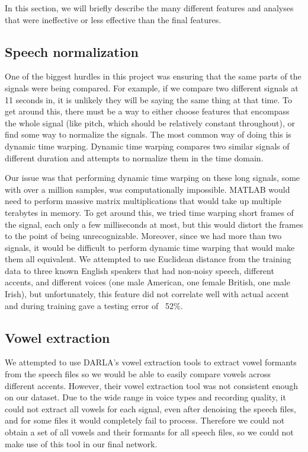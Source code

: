 \documentclass{article}
\begin{document}
In this section, we will briefly describe the many different features and analyses that were ineffective or less effective than the final features.

\subsection{Speech normalization}
\label{subsec:normalization}

One of the biggest hurdles in this project was ensuring that the same parts of the signals were being compared.
For example, if we compare two different signals at 11 seconds in, it is unlikely they will be saying the same thing at that time.
To get around this, there must be a way to  either choose features that encompass the whole signal (like pitch, which should be relatively constant throughout), or find some way to normalize the signals.
The most common way of doing this is dynamic time warping.
Dynamic time warping compares two similar signals of different duration and attempts to normalize them in the time domain.

Our issue was that performing dynamic time warping on these long signals, some with over a million samples, was computationally impossible.
MATLAB would need to perform massive matrix multiplications that would take up multiple terabytes in memory.
To get around this, we tried time warping short frames of the signal, each only a few milliseconds at most, but this would distort the frames to the point of being unrecognizable.
Moreover, since we had more than two signals, it would be difficult to perform dynamic time warping that would make them all equivalent.
We attempted to use Euclidean distance from the training data to three known English speakers that had non-noisy speech, different accents, and different voices (one male American, one female British, one male Irish), but unfortunately, this feature did not correlate well with actual accent and during training gave a testing error of ~52\%.

\subsection{Vowel extraction}
\label{subsec:vowel}

We attempted to use DARLA’s vowel extraction tools \cite{DARLA} to extract vowel formants from the speech files so we would be able to easily compare vowels across different accents.
However, their vowel extraction tool was not consistent enough on our dataset.
Due to the wide range in voice types and recording quality, it could not extract all vowels for each signal, even after denoising the speech files, and for some files it would completely fail to process.
Therefore we could not obtain a set of all vowels and their formants for all speech files, so we could not make use of this tool in our final network.
\end{document}
